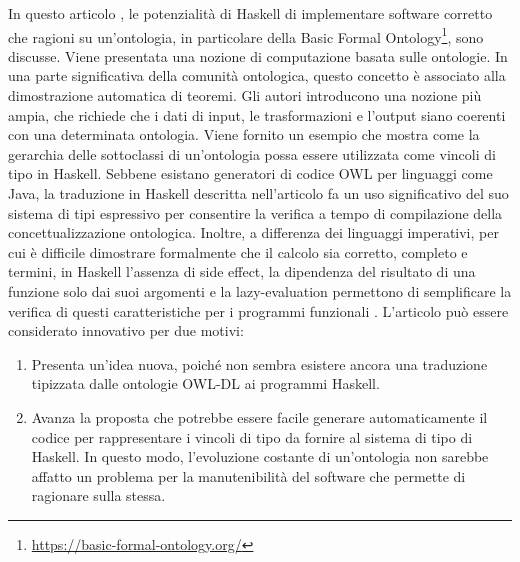 In questo articolo \cite{verifiableontologybasedcomputation}, le potenzialità di Haskell di implementare software corretto che ragioni su un'ontologia, in particolare della Basic Formal Ontology\footnote{\url{https://basic-formal-ontology.org/}}, sono discusse. Viene presentata una nozione di computazione basata sulle ontologie. In una parte significativa della comunità ontologica, questo concetto è associato alla dimostrazione automatica di teoremi. Gli autori introducono una nozione più ampia, che richiede che i dati di input, le trasformazioni e l'output siano coerenti con una determinata ontologia. Viene fornito un esempio che mostra come la gerarchia delle sottoclassi di un'ontologia possa essere utilizzata come vincoli di tipo in Haskell. Sebbene esistano generatori di codice OWL per linguaggi come Java, la traduzione in Haskell descritta nell'articolo fa un uso significativo del suo sistema di tipi espressivo per consentire la verifica a tempo di compilazione della concettualizzazione ontologica. Inoltre, a differenza dei linguaggi imperativi, per cui è difficile dimostrare formalmente che il calcolo sia corretto, completo e termini, in Haskell l'assenza di side effect, la dipendenza del risultato di una funzione solo dai suoi argomenti e la lazy-evaluation permettono di semplificare la verifica di questi caratteristiche per i programmi funzionali \cite{hugheswhyFPMatters}. L'articolo può essere considerato innovativo per due motivi:
\begin{enumerate}
	\item Presenta un'idea nuova, poiché non sembra esistere ancora una traduzione tipizzata dalle ontologie OWL-DL ai programmi Haskell.
	\item Avanza la proposta che potrebbe essere facile generare automaticamente il codice per rappresentare i vincoli di tipo da fornire al sistema di tipo di Haskell. In questo modo, l'evoluzione costante di un'ontologia non sarebbe affatto un problema per la manutenibilità del software che permette di ragionare sulla stessa.
\end{enumerate}


